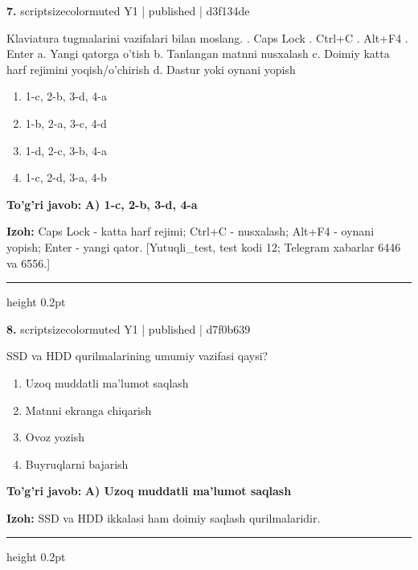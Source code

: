 \documentclass[10pt,a4paper]{article}
\begin{document}
{\bfseries\sffamily\color{ink} 7.} {scriptsizecolor{muted} Y1 | published | d3f134de}
\par
Klaviatura tugmalarini vazifalari bilan moslang. . Caps Lock . Ctrl+C . Alt+F4 . Enter \newline a. Yangi qatorga o'tish \newline b. Tanlangan matnni nusxalash \newline c. Doimiy katta harf rejimini yoqish/o'chirish \newline d. Dastur yoki oynani yopish
\begin{enumerate}[label=\Alph*),leftmargin=9mm]
\item 1-c, 2-b, 3-d, 4-a
\item 1-b, 2-a, 3-c, 4-d
\item 1-d, 2-c, 3-b, 4-a
\item 1-c, 2-d, 3-a, 4-b
\end{enumerate}
\begin{tcolorbox}[enhanced,breakable,colback=teal!4,colframe=teal!60!black,boxrule=0.45pt,arc=1.2mm,left=2.7mm,right=2.7mm,top=1.8mm,bottom=1.8mm,before skip=2mm,after skip=2mm]
{\bfseries\sffamily\color{teal}To'g'ri javob:} \textbf{A) 1-c, 2-b, 3-d, 4-a}
\par\smallskip
{\bfseries Izoh:} Caps Lock - katta harf rejimi; Ctrl+C - nusxalash; Alt+F4 - oynani yopish; Enter - yangi qator. [Yutuqli\_test, test kodi 12; Telegram xabarlar 6446 va 6556.]
\end{tcolorbox}
\vspace{2mm}\hrule height 0.2pt\vspace{3mm}

{\bfseries\sffamily\color{ink} 8.} {scriptsizecolor{muted} Y1 | published | d7f0b639}
\par
SSD va HDD qurilmalarining umumiy vazifasi qaysi?
\begin{enumerate}[label=\Alph*),leftmargin=9mm]
\item Uzoq muddatli ma'lumot saqlash
\item Matnni ekranga chiqarish
\item Ovoz yozish
\item Buyruqlarni bajarish
\end{enumerate}
\begin{tcolorbox}[enhanced,breakable,colback=teal!4,colframe=teal!60!black,boxrule=0.45pt,arc=1.2mm,left=2.7mm,right=2.7mm,top=1.8mm,bottom=1.8mm,before skip=2mm,after skip=2mm]
{\bfseries\sffamily\color{teal}To'g'ri javob:} \textbf{A) Uzoq muddatli ma'lumot saqlash}
\par\smallskip
{\bfseries Izoh:} SSD va HDD ikkalasi ham doimiy saqlash qurilmalaridir.
\end{tcolorbox}
\vspace{2mm}\hrule height 0.2pt\vspace{3mm}
\end{document}
